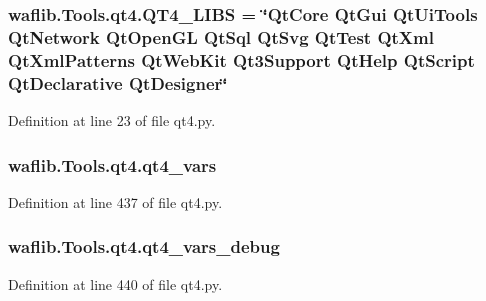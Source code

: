 \subsubsection[{\texorpdfstring{Q\+T4\+\_\+\+L\+I\+BS}{QT4_LIBS}}]{ waflib.\+Tools.\+qt4.\+Q\+T4\+\_\+\+L\+I\+BS = \char`\"{}Qt\+Core Qt\+Gui Qt\+Ui\+Tools Qt\+Network Qt\+Open\+GL Qt\+Sql Qt\+Svg Qt\+Test Qt\+Xml Qt\+Xml\+Patterns Qt\+Web\+Kit Qt3\+Support Qt\+Help Qt\+Script Qt\+Declarative Qt\+Designer\char`\"{}}\hypertarget{namespacewaflib_1_1_tools_1_1qt4_ac13f7adabbf71627a6f890c063bbf37c}{}\label{namespacewaflib_1_1_tools_1_1qt4_ac13f7adabbf71627a6f890c063bbf37c}


Definition at line 23 of file qt4.\+py.

\subsubsection[{\texorpdfstring{qt4\+\_\+vars}{qt4_vars}}]{\setlength{\rightskip}{0pt plus 5cm}waflib.\+Tools.\+qt4.\+qt4\+\_\+vars}\hypertarget{namespacewaflib_1_1_tools_1_1qt4_a8fd63057f4dbeb4a6ad456a4586e6b9c}{}\label{namespacewaflib_1_1_tools_1_1qt4_a8fd63057f4dbeb4a6ad456a4586e6b9c}


Definition at line 437 of file qt4.\+py.

\subsubsection[{\texorpdfstring{qt4\+\_\+vars\+\_\+debug}{qt4_vars_debug}}]{\setlength{\rightskip}{0pt plus 5cm}waflib.\+Tools.\+qt4.\+qt4\+\_\+vars\+\_\+debug}\hypertarget{namespacewaflib_1_1_tools_1_1qt4_a7e80b38df8e0bdcbb19c7212ad747ff1}{}\label{namespacewaflib_1_1_tools_1_1qt4_a7e80b38df8e0bdcbb19c7212ad747ff1}


Definition at line 440 of file qt4.\+py.

